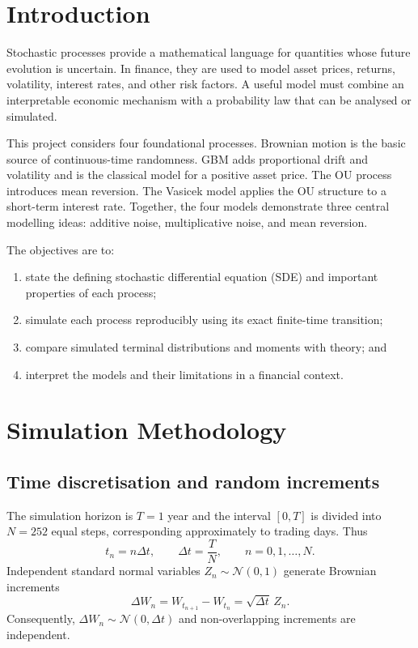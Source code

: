\documentclass[11pt,a4paper]{article}
\newcommand{\Normal}{\mathcal{N}}
\begin{document}
\section{Introduction}

Stochastic processes provide a mathematical language for quantities whose future evolution is uncertain. In finance, they are used to model asset prices, returns, volatility, interest rates, and other risk factors. A useful model must combine an interpretable economic mechanism with a probability law that can be analysed or simulated.

This project considers four foundational processes. Brownian motion is the basic source of continuous-time randomness. GBM adds proportional drift and volatility and is the classical model for a positive asset price. The OU process introduces mean reversion. The Vasicek model applies the OU structure to a short-term interest rate. Together, the four models demonstrate three central modelling ideas: additive noise, multiplicative noise, and mean reversion.

The objectives are to:
\begin{enumerate}
  \item state the defining stochastic differential equation (SDE) and important properties of each process;
  \item simulate each process reproducibly using its exact finite-time transition;
  \item compare simulated terminal distributions and moments with theory; and
  \item interpret the models and their limitations in a financial context.
\end{enumerate}

\section{Simulation Methodology}

\subsection{Time discretisation and random increments}

The simulation horizon is $T=1$ year and the interval $[0,T]$ is divided into $N=252$ equal steps, corresponding approximately to trading days. Thus
\[
  t_n=n\Delta t, \qquad \Delta t=\frac{T}{N}, \qquad n=0,1,\ldots,N.
\]
Independent standard normal variables $Z_n\sim\Normal(0,1)$ generate Brownian increments
\[
  \Delta W_n=W_{t_{n+1}}-W_{t_n}=\sqrt{\Delta t}\,Z_n.
\]
Consequently, $\Delta W_n\sim\Normal(0,\Delta t)$ and non-overlapping increments are independent.
\end{document}

